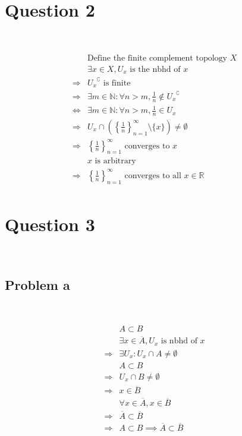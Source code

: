 \documentclass{article}
\begin{document}
\newpage

\section*{Question 2}

~

\begin{equation*}
    \begin{split}
        &\text{Define the finite complement topology }X\\
        &\exists x\in X,U_x\text{ is the nbhd of }x\\
        \Rightarrow&{U_x}^\complement\text{ is finite}\\
        \Rightarrow&\exists m\in\mathbb{N} :\forall n>m,\frac{1}{n}\notin {U_x}^\complement\\
        \Leftrightarrow&\exists m\in\mathbb{N} :\forall n>m,\frac{1}{n}\in {U_x}\\
        \Rightarrow&U_x\cap(\left\{\frac{1}{n}\right\}^\infty_{n=1}\setminus \{x\})\ne \emptyset\\
        \Rightarrow&\left\{\frac{1}{n}\right\}^\infty_{n=1}\text{ converges to }x\\
        &x\text{ is arbitrary}\\
        \Rightarrow&\left\{\frac{1}{n}\right\}^\infty_{n=1}\text{ converges to all }x\in \mathbb{R} \\    \end{split}
\end{equation*}

\newpage

\section*{Question 3}

~

\subsection*{Problem a}

~

\begin{equation*}
    \begin{split}
        &A\subset B\\
        &\exists x\in \overline{A},U_x\text{ is nbhd of }x\\
        \Rightarrow&\exists U_x:U_x\cap A\ne \emptyset\\
        &A\subset B\\
        \Rightarrow&U_x\cap B\ne\emptyset\\
        \Rightarrow&x\in\overline{B}\\
        &\forall x\in \overline{A},x\in\overline{B}\\
        \Rightarrow&\overline{A}\subset\overline{B}\\
        \Rightarrow&A\subset B\implies\overline{A}\subset\overline{B}\\
    \end{split}
\end{equation*}
\end{document}
